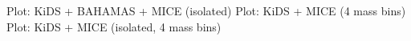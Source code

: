 \documentclass[usenatbib]{mnras}
\begin{document}
Plot: KiDS + BAHAMAS + MICE (isolated)
Plot: KiDS + MICE (4 mass bins)
Plot: KiDS + MICE (isolated, 4 mass bins)

\end{document}
